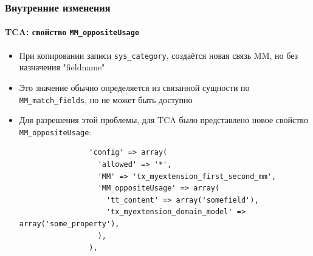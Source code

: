 \begin{frame}[fragile]
	\frametitle{Внутренние изменения}
	\framesubtitle{TCA: свойство \texttt{MM\_oppositeUsage}}

	\lstset{
		basicstyle=\tiny\ttfamily
	}

	\begin{itemize}
		\item При копировании записи \texttt{sys\_category}, создаётся новая связь MM, но без назначения "fieldname"
		\item Это значение обычно определяется из связанной сущности по \texttt{MM\_match\_fields}, но не может быть доступно
		\item Для разрешения этой проблемы, для TCA было представлено новое свойство \texttt{MM\_oppositeUsage}:

			\begin{lstlisting}
				'config' => array(
				  'allowed' => '*',
				  'MM' => 'tx_myextension_first_second_mm',
				  'MM_oppositeUsage' => array(
				    'tt_content' => array('somefield'),
				    'tx_myextension_domain_model' => array('some_property'),
				  ),
				),
			\end{lstlisting}

	\end{itemize}

\end{frame}


